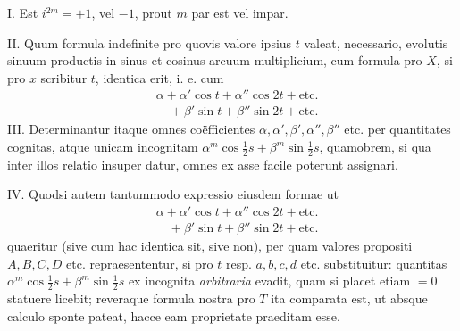 I. Est $i^{2m}=+1$, vel $-1$, prout $m$ par est vel impar.

II. Quum formula indefinite pro quovis valore ipsius $t$ valeat, necessario,
evolutis sinuum productis in sinus et cosinus arcuum multiplicium, cum formula
pro $X$, si pro $x$ scribitur $t$, identica erit, i. e. cum
\[
\begin{aligned}
&\alpha+\alpha'\cos t+\alpha''\cos2t+\text{etc.}\\[5pt]
&\quad+\beta'\sin t+\beta''\sin2t+\text{etc.}
\end{aligned}
\]
III. Determinantur itaque omnes coëfficientes $\alpha,\alpha',\beta',\alpha'',\beta''$ etc. per quantitates cognitas, atque unicam incognitam
$\alpha^m\cos\tfrac12s+\beta^m\sin\tfrac12s$, quamobrem, si
qua inter illos relatio insuper datur, omnes ex asse facile poterunt assignari.
\par{}
IV. Quodsi autem tantummodo expressio eiusdem formae ut
\[
\begin{aligned}
&\alpha+\alpha'\cos t+\alpha''\cos2t+\text{etc.}\\[5pt]
&\quad+\beta'\sin t+\beta''\sin2t+\text{etc.}
\end{aligned}
\]
quaeritur (sive cum hac identica sit, sive non), per quam valores propositi
$A,B,C,D$ etc. repraesententur, si pro $t$ resp. $a,b,c,d$ etc. substituitur: quantitas
$\alpha^m\cos\tfrac12s+\beta^m\sin\tfrac12s$ ex incognita \emph{arbitraria} evadit, quam si placet etiam $=0$
statuere licebit; reveraque formula nostra pro $T$ ita comparata est, ut absque
calculo sponte pateat, hacce eam proprietate praeditam esse.

